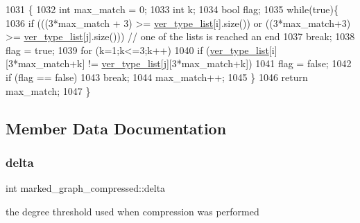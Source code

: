 \begin{DoxyCode}
1031                                                         \{
1032   \textcolor{keywordtype}{int} max\_match = 0;
1033   \textcolor{keywordtype}{int} k;
1034   \textcolor{keywordtype}{bool} flag;
1035   \textcolor{keywordflow}{while}(\textcolor{keyword}{true})\{
1036     \textcolor{keywordflow}{if} (((3*max\_match + 3) >= \hyperlink{classmarked__graph__compressed_af2e3e55223d436628a02758dfae88493}{ver\_type\_list}[i].size()) or ((3*max\_match+3) >= 
      \hyperlink{classmarked__graph__compressed_af2e3e55223d436628a02758dfae88493}{ver\_type\_list}[j].size())) \textcolor{comment}{// one of the lists is reached an end}
1037       \textcolor{keywordflow}{break};
1038     flag = \textcolor{keyword}{true};
1039     \textcolor{keywordflow}{for} (k=1;k<=3;k++)
1040       \textcolor{keywordflow}{if} (\hyperlink{classmarked__graph__compressed_af2e3e55223d436628a02758dfae88493}{ver\_type\_list}[i][3*max\_match+k] != \hyperlink{classmarked__graph__compressed_af2e3e55223d436628a02758dfae88493}{ver\_type\_list}[j][3*max\_match+k])
1041         flag = \textcolor{keyword}{false};
1042     \textcolor{keywordflow}{if} (flag == \textcolor{keyword}{false})
1043       \textcolor{keywordflow}{break};
1044     max\_match++;
1045   \}
1046   \textcolor{keywordflow}{return} max\_match;
1047 \}
\end{DoxyCode}


\subsection{Member Data Documentation}
\mbox{\label{classmarked__graph__compressed_a8b2aaac68e9332ddc78d88eb60b323a7}} 
\subsubsection{\texorpdfstring{delta}{delta}}
{\footnotesize\ttfamily int marked\+\_\+graph\+\_\+compressed\+::delta}



the degree threshold used when compression was performed 

\mbox{\label{classmarked__graph__compressed_af6ff623407b673d08d0cab77b39c2193}} 
